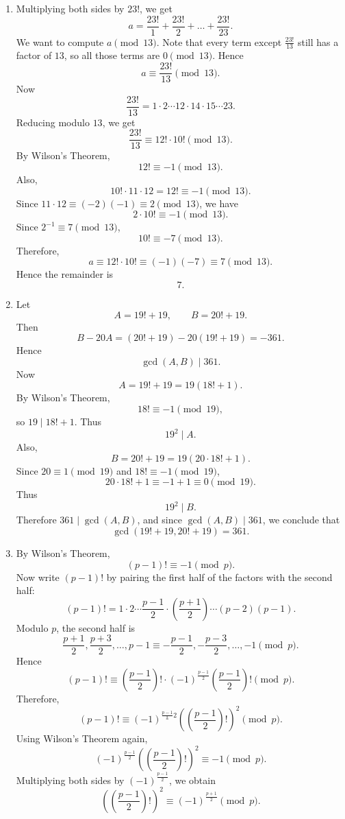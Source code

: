 \documentclass{article}
\begin{document}
    \begin{enumerate}
        \item Multiplying both sides by $23!$, we get
        $$a = \frac{23!}{1} + \frac{23!}{2} + \dots + \frac{23!}{23}.$$
        We want to compute $a \pmod{13}$. Note that every term except $\frac{23!}{13}$ still has a factor of $13$, so all those terms are $0 \pmod{13}$. Hence
        $$a \equiv \frac{23!}{13} \pmod{13}.$$
        Now
        $$\frac{23!}{13} = 1 \cdot 2 \cdots 12 \cdot 14 \cdot 15 \cdots 23.$$
        Reducing modulo $13$, we get
        $$\frac{23!}{13} \equiv 12! \cdot 10! \pmod{13}.$$
        By Wilson's Theorem,
        $$12! \equiv -1 \pmod{13}.$$
        Also,
        $$10! \cdot 11 \cdot 12 = 12! \equiv -1 \pmod{13}.$$
        Since $11 \cdot 12 \equiv (-2)(-1) \equiv 2 \pmod{13}$, we have
        $$2 \cdot 10! \equiv -1 \pmod{13}.$$
        Since $2^{-1} \equiv 7 \pmod{13}$,
        $$10! \equiv -7 \pmod{13}.$$
        Therefore,
        $$a \equiv 12! \cdot 10! \equiv (-1)(-7) \equiv 7 \pmod{13}.$$
        Hence the remainder is
        $$\boxed{7}.$$

        \item Let
        $$A = 19! + 19, \qquad B = 20! + 19.$$
        Then
        $$B - 20A = (20! + 19) - 20(19! + 19) = -361.$$
        Hence
        $$\gcd(A,B) \mid 361.$$
        Now
        $$A = 19! + 19 = 19(18! + 1).$$
        By Wilson's Theorem,
        $$18! \equiv -1 \pmod{19},$$
        so $19 \mid 18! + 1$. Thus
        $$19^2 \mid A.$$
        Also,
        $$B = 20! + 19 = 19(20 \cdot 18! + 1).$$
        Since $20 \equiv 1 \pmod{19}$ and $18! \equiv -1 \pmod{19}$,
        $$20 \cdot 18! + 1 \equiv -1 + 1 \equiv 0 \pmod{19}.$$
        Thus
        $$19^2 \mid B.$$
        Therefore $361 \mid \gcd(A,B)$, and since $\gcd(A,B) \mid 361$, we conclude that
        $$\boxed{\gcd(19! + 19, 20! + 19) = 361}.$$

        \item By Wilson's Theorem,
        $$(p - 1)! \equiv -1 \pmod{p}.$$
        Now write $(p - 1)!$ by pairing the first half of the factors with the second half:
        $$(p - 1)! = 1 \cdot 2 \cdots \frac{p - 1}{2} \cdot \left(\frac{p + 1}{2}\right) \cdots (p - 2)(p - 1).$$
        Modulo $p$, the second half is
        $$\frac{p + 1}{2}, \frac{p + 3}{2}, \dots, p - 1
        \equiv -\frac{p - 1}{2}, -\frac{p - 3}{2}, \dots, -1 \pmod{p}.$$
        Hence
        $$(p - 1)! \equiv \left(\frac{p - 1}{2}\right)! \cdot (-1)^{\frac{p - 1}{2}}\left(\frac{p - 1}{2}\right)! \pmod{p}.$$
        Therefore,
        $$(p - 1)! \equiv (-1)^{\frac{p - 1}å{2}}\left(\left(\frac{p - 1}{2}\right)!\right)^2 \pmod{p}.$$
        Using Wilson's Theorem again,
        $$(-1)^{\frac{p - 1}{2}}\left(\left(\frac{p - 1}{2}\right)!\right)^2 \equiv -1 \pmod{p}.$$
        Multiplying both sides by $(-1)^{\frac{p - 1}{2}}$, we obtain
        $$\left(\left(\frac{p - 1}{2}\right)!\right)^2 \equiv (-1)^{\frac{p + 1}{2}} \pmod{p}.$$
    \end{enumerate}
\end{document}
